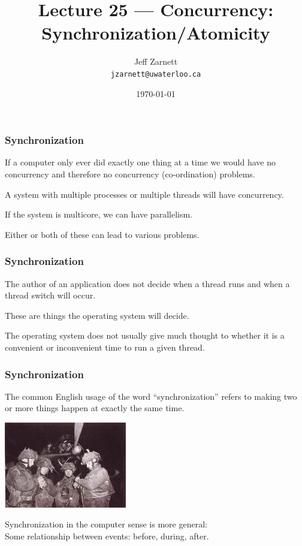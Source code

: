 

\title{Lecture 25 --- Concurrency: Synchronization/Atomicity }

\author{Jeff Zarnett \\ \small \texttt{jzarnett@uwaterloo.ca}}
\date{\today}




\begin{frame}
	\titlepage

\end{frame}


\begin{frame}
	\frametitle{Synchronization}

	If a computer only ever did exactly one thing at a time we would have no concurrency and therefore no concurrency (co-ordination) problems.

	A system with multiple processes or multiple threads will have concurrency.

	If the system is multicore, we can have parallelism.

	Either or both of these can lead to various problems.


\end{frame}

\begin{frame}
	\frametitle{Synchronization}

	The author of an application does not decide when a thread runs and when a thread switch will occur.

	These are things the operating system will decide.

	The operating system does not usually give much thought to whether it is a convenient or inconvenient time to run a given thread.


\end{frame}

\begin{frame}
	\frametitle{Synchronization}

	The common English usage of the word ``synchronization'' refers to making two or more things happen at exactly the same time.

	\begin{center}
		\includegraphics[width=0.4\textwidth]{images/synchronize-watches.jpg}
	\end{center}

	Synchronization in the computer sense is more general:\\
	\quad Some relationship between events: before, during, after.

\end{frame}


